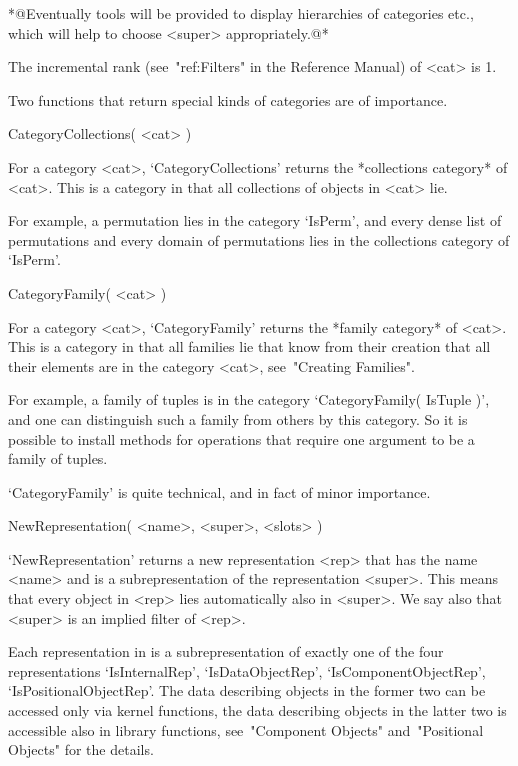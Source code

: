 *@Eventually tools will be provided to display hierarchies of
categories etc.,
which will help to choose <super> appropriately.@*

The incremental rank (see~"ref:Filters" in the Reference Manual)
of <cat> is 1.

Two functions that return special kinds of categories are of importance.

\>CategoryCollections( <cat> )

For a category <cat>,
`CategoryCollections' returns the *collections category* of <cat>.
This is a category in that all collections of objects in <cat> lie.

For example, a permutation lies in the category `IsPerm',
and every dense list of permutations and every domain of permutations
lies in the collections category of `IsPerm'.

\>CategoryFamily( <cat> )

For a category <cat>,
`CategoryFamily' returns the *family category* of <cat>.
This is a category in that all families lie that know from their
creation that all their elements are in the category <cat>,
see~"Creating Families".

For example, a family of tuples is in the category
`CategoryFamily( IsTuple )',
and one can distinguish such a family from others by this category.
So it is possible to install methods for operations that require one
argument to be a family of tuples.

`CategoryFamily' is quite technical, and in fact of minor importance.



\>NewRepresentation( <name>, <super>, <slots> )

`NewRepresentation' returns a new representation <rep> that has the name
<name> and is a subrepresentation of the representation <super>.
This means that every object in <rep> lies automatically also in <super>.
We say also that <super> is an implied filter of <rep>.

Each representation in {\GAP} is a subrepresentation of exactly one
of the four representations `IsInternalRep', `IsDataObjectRep',
`IsComponentObjectRep', `IsPositionalObjectRep'.
The data describing objects in the former two can be accessed only via
{\GAP} kernel functions, the data describing objects in the latter two
is accessible also in library functions, see~"Component Objects"
and~"Positional Objects" for the details.

